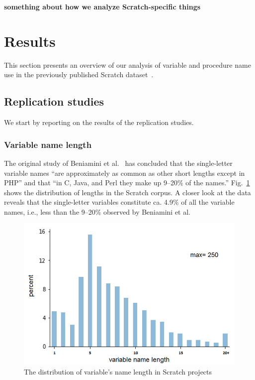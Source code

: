 \documentclass[conference]{IEEEtran}
\newcommand{\todo}[1]{ \textbf{#1} }
\begin{document}
\todo{something about how we analyze Scratch-specific things}

 \section{Results}
This section presents an overview of our analysis of variable and procedure name use in the previously published Scratch dataset~\cite{Aivaloglou2016HowKC}.

\subsection{Replication studies}
We start by reporting on the results of the replication studies.

\subsubsection{Variable name length}
\label{res:var:length}
The original study of Beniamini et al.~\cite{Beniamini} has concluded that the single-letter variable names ``are approximately as common as other short lengths except in PHP'' and that  ``in C, Java, and Perl they make up 9--20\% of the names.'' 
Fig.~\ref{fig:distribution_of_lengths} shows the distribution of lengths in the Scratch corpus. A closer look at the data reveals that the single-letter variables constitute ca. 4.9\% of all the variable names, i.e., less than the 9--20\% observed by Beniamini et al.

\begin{figure}[tb]
	\begin{center}
		\includegraphics[width=\columnwidth]{fig/varname_length_occurrences}
		\caption{The distribution of variable's name length in Scratch projects}
		\label{fig:distribution_of_lengths}
	\end{center}
\end{figure} 
\end{document}
